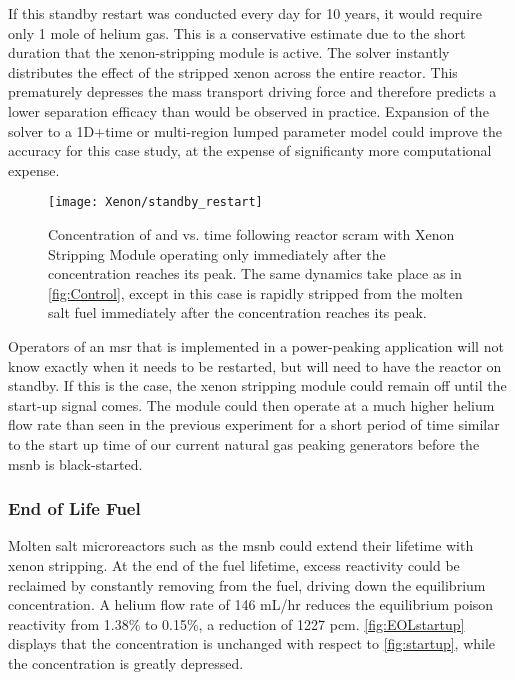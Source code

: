 If this standby restart was conducted every day for 10 years, it would require only 1 mole of helium gas. This is a conservative estimate due to the short duration that the xenon-stripping module is active. The solver instantly distributes the effect of the stripped xenon across the entire reactor. This prematurely depresses the mass transport driving force and therefore predicts a lower separation efficacy than would be observed in practice. Expansion of the solver to a 1D+time or multi-region lumped parameter model could improve the accuracy for this case study, at the expense of significanty more computational expense.

\begin{figure}[ht!]
    \centering
    \texttt{[image: Xenon/standby\_restart]}
    \caption[Concentration of \I and \Xe vs. time following reactor scram - Standby Mode]{Concentration of \I and \Xe vs. time following reactor scram with Xenon Stripping Module operating only immediately after the \Xe concentration reaches its peak. The same dynamics take place as in \cref{fig:Control}, except in this case \Xe is rapidly stripped from the molten salt fuel immediately after the \Xe concentration reaches its peak.}
    \label{fig:Standby}
\end{figure}

Operators of an \acs{msr} that is implemented in a power-peaking application will not know exactly when it needs to be restarted, but will need to have the reactor on standby. If this is the case, the xenon stripping module could remain off until the start-up signal comes. The module could then operate at a much higher helium flow rate than seen in the previous experiment for a short period of time similar to the start up time of our current natural gas peaking generators \cite{GE} before the \acs{msnb} is black-started. 

\subsubsection{End of Life Fuel}\label{sec-EOL}
 Molten salt microreactors such as the \acs{msnb} could extend their lifetime with xenon stripping. At the end of the fuel lifetime, excess reactivity could be reclaimed by constantly removing \Xe from the fuel, driving down the equilibrium concentration. A helium flow rate of 146 mL/hr reduces the equilibrium poison reactivity from 1.38\% to 0.15\%, a reduction of 1227 pcm. \cref{fig:EOLstartup} displays that the \I concentration is unchanged with respect to \cref{fig:startup}, while the \Xe concentration is greatly depressed. 
 
